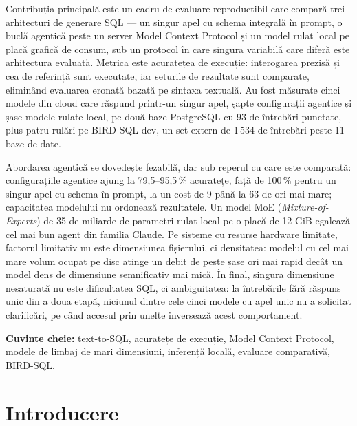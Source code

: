 \documentclass[12pt,a4paper]{report}
\begin{document}
Contribuția principală este un cadru de evaluare reproductibil care compară trei
arhitecturi de generare SQL — un singur apel cu schema integrală în prompt,
o buclă agentică peste un server Model Context Protocol și un model rulat
local pe placă grafică de consum, sub un protocol în care singura variabilă
care diferă este arhitectura evaluată. Metrica este acuratețea de execuție:
interogarea prezisă și cea de referință sunt executate, iar seturile de
rezultate sunt comparate, eliminând evaluarea eronată bazată pe sintaxa textuală.
Au fost măsurate cinci modele din cloud care răspund printr-un singur apel,
șapte configurații agentice și șase modele rulate local,
pe două baze PostgreSQL cu 93 de întrebări punctate, plus patru rulări pe
BIRD-SQL dev, un set extern de 1\,534 de întrebări peste 11 baze de date.

Abordarea agentică se dovedește fezabilă, dar sub reperul cu care este
comparată: configurațiile agentice ajung la 79,5--95,5\,\% acuratețe, față
de 100\,\% pentru un singur apel cu schema în prompt, la un cost de 9 până
la 63 de ori mai mare; capacitatea modelului nu ordonează rezultatele. Un model MoE (\emph{Mixture-of-Experts}) de 35 de miliarde de
parametri rulat local pe
o placă de 12 GiB egalează cel mai bun agent din familia Claude. Pe
sisteme cu resurse hardware limitate, factorul limitativ nu este dimensiunea fișierului, ci densitatea:
modelul cu cel mai mare volum ocupat pe disc atinge un debit de peste șase ori mai rapid decât un model
dens de dimensiune semnificativ mai mică. În final, singura dimensiune
nesaturată nu este dificultatea SQL, ci ambiguitatea: la întrebările fără răspuns unic din a doua etapă, niciunul dintre cele cinci modele cu apel unic
nu a solicitat clarificări, pe când accesul prin unelte inversează acest comportament.

\vspace{0.35cm}
\noindent\textbf{Cuvinte cheie:} text-to-SQL, acuratețe de execuție,
Model Context Protocol, modele de limbaj de mari dimensiuni, inferență
locală, evaluare comparativă, BIRD-SQL.

\newpage
\tableofcontents
\newpage

\setcounter{page}{1}

\chapter{Introducere}
\label{chap:intro}
\end{document}
